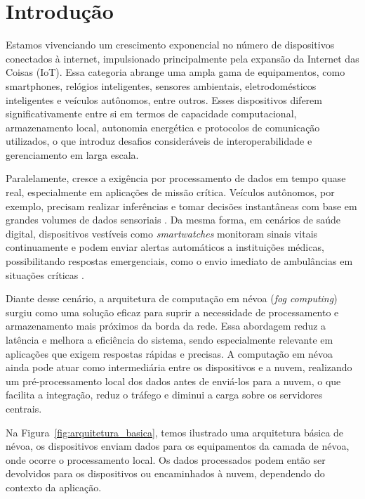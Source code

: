 \chapter{Introdução}\label{cap:introducao}

Estamos vivenciando um crescimento exponencial no número de dispositivos conectados à internet, impulsionado principalmente pela expansão da Internet das Coisas (IoT). Essa categoria abrange uma ampla gama de equipamentos, como smartphones, relógios inteligentes, sensores ambientais, eletrodomésticos inteligentes e veículos autônomos, entre outros. Esses dispositivos diferem significativamente entre si em termos de capacidade computacional, armazenamento local, autonomia energética e protocolos de comunicação utilizados, o que introduz desafios consideráveis de interoperabilidade e gerenciamento em larga escala.

Paralelamente, cresce a exigência por processamento de dados em tempo quase real, especialmente em aplicações de missão crítica. Veículos autônomos, por exemplo, precisam realizar inferências e tomar decisões instantâneas com base em grandes volumes de dados sensoriais \cite{markakis2017}. Da mesma forma, em cenários de saúde digital, dispositivos vestíveis como \textit{smartwatches} monitoram sinais vitais continuamente e podem enviar alertas automáticos a instituições médicas, possibilitando respostas emergenciais, como o envio imediato de ambulâncias em situações críticas \cite{cassel2024}.

Diante desse cenário, a arquitetura de computação em névoa (\textit{fog computing}) surgiu como uma solução eficaz para suprir a necessidade de processamento e armazenamento mais próximos da borda da rede. Essa abordagem reduz a latência e melhora a eficiência do sistema, sendo especialmente relevante em aplicações que exigem respostas rápidas e precisas. A computação em névoa ainda pode atuar como intermediária entre os dispositivos e a nuvem, realizando um pré-processamento local dos dados antes de enviá-los para a nuvem, o que facilita a integração, reduz o tráfego e diminui a carga sobre os servidores centrais.

Na Figura~\ref{fig:arquitetura_basica}, temos ilustrado uma arquitetura básica de névoa, os dispositivos enviam dados para os equipamentos da camada de névoa, onde ocorre o processamento local. Os dados processados podem então ser devolvidos para os dispositivos ou encaminhados à nuvem, dependendo do contexto da aplicação.

